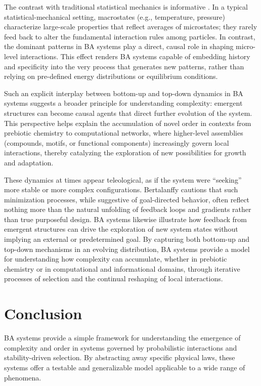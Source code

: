 \documentclass[entropy,article,submit,pdftex,moreauthors]{Definitions/mdpi}
\begin{document}
The contrast with traditional statistical mechanics is informative \cite{landau1980statistical}. In a typical statistical-mechanical setting, macrostates (e.g., temperature, pressure) characterize large-scale properties that reflect averages of microstates; they rarely feed back to alter the fundamental interaction rules among particles. In contrast, the dominant patterns in BA systems play a direct, causal role in shaping micro-level interactions. This effect renders BA systems capable of embedding history and specificity into the very process that generates new patterns, rather than relying on pre-defined energy distributions or equilibrium conditions.

Such an explicit interplay between bottom-up and top-down dynamics in BA systems suggests a broader principle for understanding complexity: emergent structures can become causal agents that direct further evolution of the system. This perspective helps explain the accumulation of novel order in contexts from prebiotic chemistry to computational networks, where higher-level assemblies (compounds, motifs, or functional components) increasingly govern local interactions, thereby catalyzing the exploration of new possibilities for growth and adaptation.

These dynamics at times appear teleological, as if the system were ``seeking'' more stable or more complex configurations. Bertalanffy \cite{bertalanffy1968general} cautions that such minimization processes, while suggestive of goal-directed behavior, often reflect nothing more than the natural unfolding of feedback loops and gradients rather than true purposeful design. BA systems likewise illustrate how feedback from emergent structures can drive the exploration of new system states without implying an external or predetermined goal. By capturing both bottom-up and top-down mechanisms in an evolving distribution, BA systems provide a model for understanding how complexity can accumulate, whether in prebiotic chemistry or in computational and informational domains, through iterative processes of selection and the continual reshaping of local interactions.


\section{Conclusion}

BA systems provide a simple framework for understanding the emergence of complexity and order in systems governed by probabilistic interactions and stability-driven selection. By abstracting away specific physical laws, these systems offer a testable and generalizable model applicable to a wide range of phenomena. 
\end{document}
